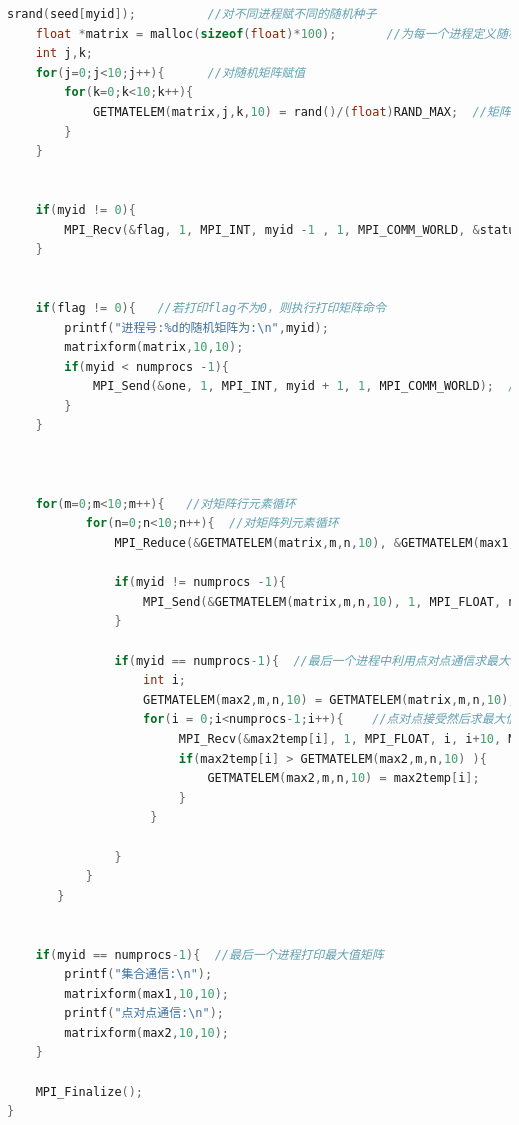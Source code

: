 \documentclass[a4paper,11pt]{article}
\begin{document}
\begin{lstlisting}[language = C]
    srand(seed[myid]);          //对不同进程赋不同的随机种子
    float *matrix = malloc(sizeof(float)*100);       //为每一个进程定义随机矩阵
    int j,k;
    for(j=0;j<10;j++){      //对随机矩阵赋值
        for(k=0;k<10;k++){
            GETMATELEM(matrix,j,k,10) = rand()/(float)RAND_MAX;  //矩阵元为（0，1）随机f单精度浮点数
        }
    }
    
    
    if(myid != 0){
        MPI_Recv(&flag, 1, MPI_INT, myid -1 , 1, MPI_COMM_WORLD, &status);//接受上一个进程传入的打印矩阵flag参数
    }
    
    
    if(flag != 0){   //若打印flag不为0，则执行打印矩阵命令
        printf("进程号:%d的随机矩阵为:\n",myid);
        matrixform(matrix,10,10);
        if(myid < numprocs -1){
            MPI_Send(&one, 1, MPI_INT, myid + 1, 1, MPI_COMM_WORLD);  //向下一个进程传入的打印矩阵flag参数
        }
    }
   
        
    
    for(m=0;m<10;m++){   //对矩阵行元素循环
           for(n=0;n<10;n++){  //对矩阵列元素循环
               MPI_Reduce(&GETMATELEM(matrix,m,n,10), &GETMATELEM(max1,m,n,10), 1, MPI_FLOAT, MPI_MAX, numprocs-1, MPI_COMM_WORLD); //集合通信求最大值矩阵
               
               if(myid != numprocs -1){
                   MPI_Send(&GETMATELEM(matrix,m,n,10), 1, MPI_FLOAT, numprocs -1, myid+10, MPI_COMM_WORLD); // 点对点通信
               }
               
               if(myid == numprocs-1){  //最后一个进程中利用点对点通信求最大值
                   int i;
                   GETMATELEM(max2,m,n,10) = GETMATELEM(matrix,m,n,10);
                   for(i = 0;i<numprocs-1;i++){    //点对点接受然后求最大值
                        MPI_Recv(&max2temp[i], 1, MPI_FLOAT, i, i+10, MPI_COMM_WORLD, &status);
                        if(max2temp[i] > GETMATELEM(max2,m,n,10) ){
                            GETMATELEM(max2,m,n,10) = max2temp[i];
                        }
                    }
                   
               }
           }
       }
     
    
    if(myid == numprocs-1){  //最后一个进程打印最大值矩阵
        printf("集合通信:\n");
        matrixform(max1,10,10);
        printf("点对点通信:\n");
        matrixform(max2,10,10);
    }
        
    MPI_Finalize();
}

	
\end{lstlisting}
\end{document}

